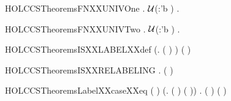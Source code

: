 \newcommand{\HOLCCSTheoremsFNXXind}{\UseVerbatim{HOLCCSTheoremsFNXXind}}
\begin{SaveVerbatim}{HOLCCSTheoremsFNXXUNIVOne}
\HOLTokenTurnstile{} \HOLSymConst{\HOLTokenForall{}}.   \HOLSymConst{\HOLTokenNotEqual{}} \ensuremath{\cal{U}}(:'b ) \HOLSymConst{\HOLTokenImp{}} \HOLSymConst{\HOLTokenExists{}}.  \HOLConst{\HOLTokenNotIn{}}  
\end{SaveVerbatim}
\newcommand{\HOLCCSTheoremsFNXXUNIVOne}{\UseVerbatim{HOLCCSTheoremsFNXXUNIVOne}}
\begin{SaveVerbatim}{HOLCCSTheoremsFNXXUNIVTwo}
\HOLTokenTurnstile{} \HOLSymConst{\HOLTokenForall{}} .
         \HOLConst{\HOLTokenUnion{}}   \HOLSymConst{\HOLTokenNotEqual{}} \ensuremath{\cal{U}}(:'b ) \HOLSymConst{\HOLTokenImp{}}
       \HOLSymConst{\HOLTokenExists{}}.  \HOLConst{\HOLTokenNotIn{}}   \HOLSymConst{\HOLTokenConj{}}  \HOLConst{\HOLTokenNotIn{}}  
\end{SaveVerbatim}
\newcommand{\HOLCCSTheoremsFNXXUNIVTwo}{\UseVerbatim{HOLCCSTheoremsFNXXUNIVTwo}}
\begin{SaveVerbatim}{HOLCCSTheoremsISXXLABELXXdef}
\HOLTokenTurnstile{} (\HOLSymConst{\HOLTokenForall{}}.  ( ) \HOLSymConst{\HOLTokenEquiv{}} ) \HOLSymConst{\HOLTokenConj{}} ( \HOLConst{\ensuremath{\tau}} \HOLSymConst{\HOLTokenEquiv{}} )
\end{SaveVerbatim}
\newcommand{\HOLCCSTheoremsISXXLABELXXdef}{\UseVerbatim{HOLCCSTheoremsISXXLABELXXdef}}
\begin{SaveVerbatim}{HOLCCSTheoremsISXXRELABELING}
\HOLTokenTurnstile{} \HOLSymConst{\HOLTokenForall{}}.  ( )
\end{SaveVerbatim}
\newcommand{\HOLCCSTheoremsISXXRELABELING}{\UseVerbatim{HOLCCSTheoremsISXXRELABELING}}
\begin{SaveVerbatim}{HOLCCSTheoremsLabelXXcaseXXeq}
\HOLTokenTurnstile{} (    \HOLSymConst{=} ) \HOLSymConst{\HOLTokenEquiv{}}
   (\HOLSymConst{\HOLTokenExists{}}. ( \HOLSymConst{=}  ) \HOLSymConst{\HOLTokenConj{}} (  \HOLSymConst{=} )) \HOLSymConst{\HOLTokenDisj{}}
   \HOLSymConst{\HOLTokenExists{}}. ( \HOLSymConst{=}  ) \HOLSymConst{\HOLTokenConj{}} (  \HOLSymConst{=} )
\end{SaveVerbatim}
